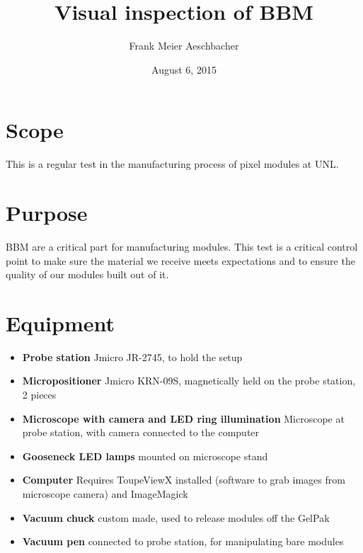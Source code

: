 \documentclass[12pt]{unlsilabsop}
\title{Visual inspection of BBM}
\date{August 6, 2015}
\author{Frank Meier Aeschbacher}
\begin{document}
\maketitle

\section{Scope}
This is a regular test in the manufacturing process of pixel modules at UNL.

\section{Purpose}
BBM are a critical part for manufacturing modules. This test is a critical control point to make sure the material we receive meets expectations and to ensure the quality of our modules built out of it.



\section{Equipment}

\begin{itemize}
\item \textbf{Probe station} Jmicro JR-2745, to hold the setup
\item \textbf{Micropositioner} Jmicro KRN-09S, magnetically held on the probe station, 2 pieces
\item \textbf{Microscope with camera and LED ring illumination} Microscope at probe station, with camera connected to the computer
\item \textbf{Gooseneck LED lamps} mounted on microscope stand
\item \textbf{Computer} Requires ToupeViewX installed (software to grab images from microscope camera) and ImageMagick
\item \textbf{Vacuum chuck} custom made, used to release modules off the GelPak
\item \textbf{Vacuum pen} connected to probe station, for manipulating bare modules
\end{itemize}
\end{document}
